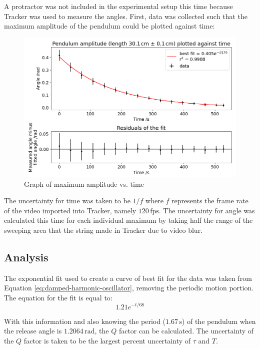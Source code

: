 \documentclass[12pt]{article}
\begin{document}
A protractor was not included in the experimental setup this time because Tracker \cite{tracker} was used to measure the angles. First, data was collected such that the maximum amplitude of the pendulum could be plotted against time:

\begin{figure}[!hptb]
    \centering
    \includegraphics[width=\textwidth]{../figures/max_amplitude_vs_time.png}
    \caption{\centering Graph of maximum amplitude vs. time}
    \label{fig:figure 4}
\end{figure}

The uncertainty for time was taken to be $1/f$ where $f$ represents the frame rate of the video imported into Tracker, namely $120\,\text{fps}$. The uncertainty for angle was calculated this time for each individual maximum by taking half the range of the sweeping area that the string made in Tracker due to video blur.

\subsection{Analysis}
The exponential fit used to create a curve of best fit for the data was taken from Equation \ref{eq:damped-harmonic-oscillator}, removing the periodic motion portion. The equation for the fit is equal to:
\begin{equation}
    1.21e^{-{t}/68}
\end{equation}

With this information and also knowing the period ($1.67\,\text{s}$) of the pendulum when the release angle is $1.2064\,\text{rad}$, the $Q$ factor can be calculated. The uncertainty of the $Q$ factor is taken to be the largest percent uncertainty of $\tau$ and $T$.
\end{document}
